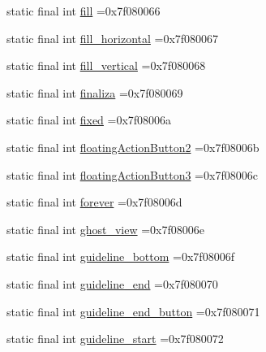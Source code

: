 \begin{DoxyCompactItemize}
\item 
static final int \mbox{\hyperlink{classbr_1_1unb_1_1cic_1_1mp_1_1marketmaster_1_1R_1_1id_abb8c918b83306db81d00ef909b3579c9}{fill}} =0x7f080066
\item 
static final int \mbox{\hyperlink{classbr_1_1unb_1_1cic_1_1mp_1_1marketmaster_1_1R_1_1id_a2c199e8680f076915b2583ca925fb0db}{fill\+\_\+horizontal}} =0x7f080067
\item 
static final int \mbox{\hyperlink{classbr_1_1unb_1_1cic_1_1mp_1_1marketmaster_1_1R_1_1id_a95465264b9c6ba72be9ed2958a51a8e9}{fill\+\_\+vertical}} =0x7f080068
\item 
static final int \mbox{\hyperlink{classbr_1_1unb_1_1cic_1_1mp_1_1marketmaster_1_1R_1_1id_a9aaeae1a2440d3ab0525ee1933e9cb05}{finaliza}} =0x7f080069
\item 
static final int \mbox{\hyperlink{classbr_1_1unb_1_1cic_1_1mp_1_1marketmaster_1_1R_1_1id_ae02043496fee3dc352cd25209403cfaa}{fixed}} =0x7f08006a
\item 
static final int \mbox{\hyperlink{classbr_1_1unb_1_1cic_1_1mp_1_1marketmaster_1_1R_1_1id_a116c5606062ccff1228f3f16fb184db5}{floating\+Action\+Button2}} =0x7f08006b
\item 
static final int \mbox{\hyperlink{classbr_1_1unb_1_1cic_1_1mp_1_1marketmaster_1_1R_1_1id_a0a94b7f57746196f110ba2be178e9820}{floating\+Action\+Button3}} =0x7f08006c
\item 
static final int \mbox{\hyperlink{classbr_1_1unb_1_1cic_1_1mp_1_1marketmaster_1_1R_1_1id_a4af54db5694a72379a97a484e46d110d}{forever}} =0x7f08006d
\item 
static final int \mbox{\hyperlink{classbr_1_1unb_1_1cic_1_1mp_1_1marketmaster_1_1R_1_1id_aef1d1481927e400ee34becfc1e9a8cc5}{ghost\+\_\+view}} =0x7f08006e
\item 
static final int \mbox{\hyperlink{classbr_1_1unb_1_1cic_1_1mp_1_1marketmaster_1_1R_1_1id_a29d19f4aaff6ee999dc6a68bb935618f}{guideline\+\_\+bottom}} =0x7f08006f
\item 
static final int \mbox{\hyperlink{classbr_1_1unb_1_1cic_1_1mp_1_1marketmaster_1_1R_1_1id_a44084c89a7a07bc12026e4853744f58f}{guideline\+\_\+end}} =0x7f080070
\item 
static final int \mbox{\hyperlink{classbr_1_1unb_1_1cic_1_1mp_1_1marketmaster_1_1R_1_1id_a38df0d398f3859245ae6edcd6f2b8813}{guideline\+\_\+end\+\_\+button}} =0x7f080071
\item 
static final int \mbox{\hyperlink{classbr_1_1unb_1_1cic_1_1mp_1_1marketmaster_1_1R_1_1id_aff085ced8c2e81e34db412d0a559bfd9}{guideline\+\_\+start}} =0x7f080072

\end{DoxyCompactItemize}
